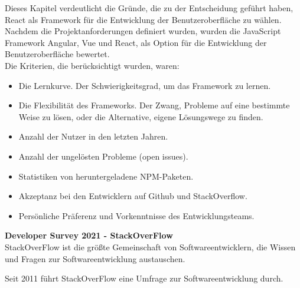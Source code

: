 \begin{flushleft}
Dieses Kapitel verdeutlicht die Gründe, die zu der Entscheidung geführt haben, React als Framework für die Entwicklung der Benutzeroberfläche zu wählen.
\\
Nachdem die Projektanforderungen definiert wurden, wurden die JavaScript Framework Angular, Vue und React, als Option für die Entwicklung der Benutzeroberfläche bewertet.
\\
Die Kriterien, die berücksichtigt wurden, waren:

\begin{itemize}
  \item
  Die Lernkurve. Der Schwierigkeitsgrad, um das Framework zu lernen.
  
  \item 
  Die Flexibilität des Frameworks.
  Der Zwang, Probleme auf eine bestimmte Weise zu lösen, oder die Alternative, eigene Lösungswege zu finden.
  
  \item 
  Anzahl der Nutzer in den letzten Jahren.
  
  \item 
  Anzahl der ungelösten Probleme (open issues).
  
  \item 
  Statistiken von heruntergeladene NPM-Paketen.
  
  \item 
  Akzeptanz bei den Entwicklern auf Github und StackOverflow.

  \item
  Persönliche Präferenz und Vorkenntnisse des Entwicklungsteams.
\end{itemize}

\end{flushleft}

\begin{flushleft}
\textbf{Developer Survey 2021 - StackOverFlow}\\
StackOverFlow ist die größte Gemeinschaft von Softwareentwicklern, die Wissen und Fragen zur Softwareentwicklung austauschen.

Seit 2011 führt StackOverFlow eine Umfrage zur Softwareentwicklung durch.
\end{flushleft}

